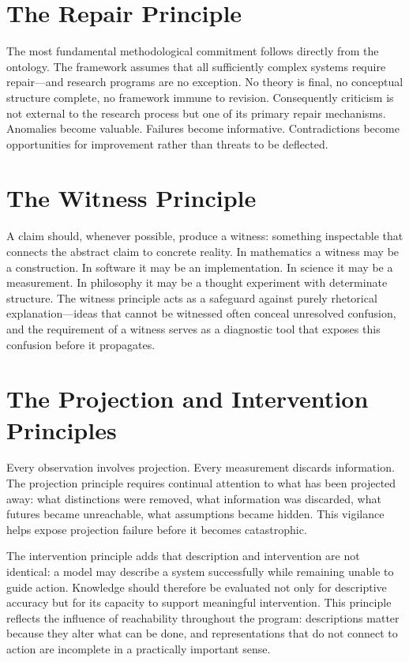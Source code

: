 \documentclass[11pt, oneside]{book}
\theoremstyle{definition}
\theoremstyle{remark}
\begin{document}
\section{The Repair Principle}

The most fundamental methodological commitment follows directly from the ontology. The framework assumes that all sufficiently complex systems require repair—and research programs are no exception. No theory is final, no conceptual structure complete, no framework immune to revision. Consequently criticism is not external to the research process but one of its primary repair mechanisms. Anomalies become valuable. Failures become informative. Contradictions become opportunities for improvement rather than threats to be deflected.

\section{The Witness Principle}

A claim should, whenever possible, produce a witness: something inspectable that connects the abstract claim to concrete reality. In mathematics a witness may be a construction. In software it may be an implementation. In science it may be a measurement. In philosophy it may be a thought experiment with determinate structure. The witness principle acts as a safeguard against purely rhetorical explanation—ideas that cannot be witnessed often conceal unresolved confusion, and the requirement of a witness serves as a diagnostic tool that exposes this confusion before it propagates.

\section{The Projection and Intervention Principles}

Every observation involves projection. Every measurement discards information. The projection principle requires continual attention to what has been projected away: what distinctions were removed, what information was discarded, what futures became unreachable, what assumptions became hidden. This vigilance helps expose projection failure before it becomes catastrophic.

The intervention principle adds that description and intervention are not identical: a model may describe a system successfully while remaining unable to guide action. Knowledge should therefore be evaluated not only for descriptive accuracy but for its capacity to support meaningful intervention. This principle reflects the influence of reachability throughout the program: descriptions matter because they alter what can be done, and representations that do not connect to action are incomplete in a practically important sense.
\end{document}
